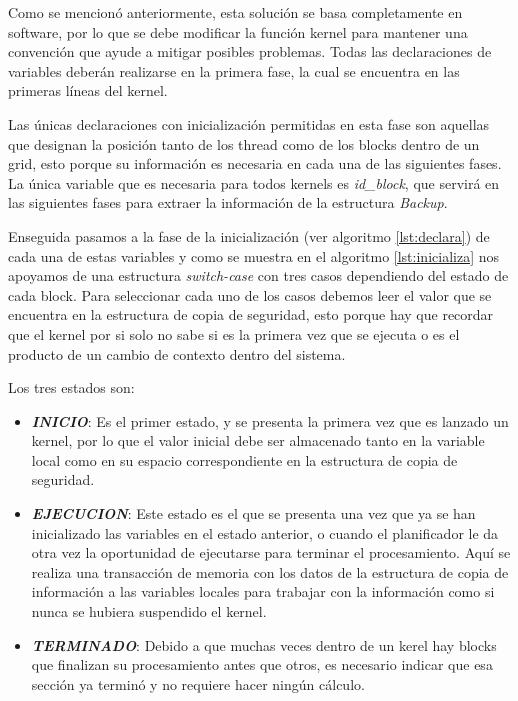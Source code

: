 Como se mencionó anteriormente, esta solución se basa completamente en software, por lo que se debe modificar la función kernel para mantener una convención que ayude a mitigar posibles problemas. Todas las declaraciones de variables deberán realizarse en la primera fase, la cual se encuentra en las primeras líneas del kernel.
\newline

Las únicas declaraciones con inicialización permitidas en esta fase son aquellas que designan la posición tanto de los thread como de los blocks dentro de un grid, esto porque  su información es necesaria en cada una de las siguientes fases. La única variable que es necesaria para todos kernels es \textit{id\_block}, que servirá en las siguientes fases para extraer la información de la estructura \textit{Backup}.



Enseguida pasamos a la fase de la inicialización (ver algoritmo \ref{lst:declara}) de cada una de estas variables y como se muestra en el algoritmo \ref{lst:inicializa} nos apoyamos de una estructura \textit{switch-case} con tres casos dependiendo del estado de cada block. Para seleccionar cada uno de los casos debemos leer el valor que se encuentra en la estructura de copia de seguridad, esto porque hay que recordar que el kernel por si solo no sabe si es la primera vez que se ejecuta o es el producto de un cambio de contexto dentro del sistema.
\newline

Los tres estados son:

\begin{itemize}
\item \textit{\textbf{INICIO}}: Es el primer estado, y se presenta la primera vez que es lanzado un kernel, por lo que el valor inicial debe ser almacenado tanto en la variable local como en su espacio correspondiente en la estructura de copia de seguridad.

\item \textit{\textbf{EJECUCION}}: Este estado es el que se presenta una vez que ya se han inicializado las variables en el estado anterior, o cuando el planificador le da otra vez la oportunidad de ejecutarse para terminar el procesamiento. Aquí se realiza una transacción de memoria con los datos de la estructura de copia de información a las variables locales para trabajar con la información como si nunca se hubiera suspendido el kernel.

\item \textit{\textbf{TERMINADO}}: Debido a que muchas veces dentro de un kerel hay blocks que finalizan su procesamiento antes que otros, es necesario indicar que esa sección ya terminó y no requiere hacer ningún cálculo.
\end{itemize}

